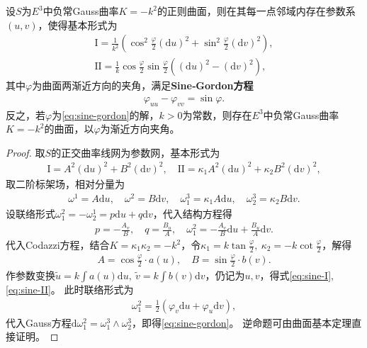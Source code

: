 \documentclass[../../main.tex]{subfiles}%
\begin{document}
\begin{proposition}
设$S$为$E^3$中负常Gauss曲率$K=-k^2$的正则曲面，则在其每一点邻域内存在参数系$(u,v)$，使得基本形式为
\begin{align}
\mathrm{I}=\frac{1}{k^2}\left(\cos^2\frac{\varphi}{2}(\mathrm{d}u)^2+\sin^2\frac{\varphi}{2}(\mathrm{d}v)^2\right),\label{eq:sine-I}\\
\mathrm{II}=\frac{1}{k}\cos\frac{\varphi}{2}\sin\frac{\varphi}{2}\left((\mathrm{d}u)^2-(\mathrm{d}v)^2\right),\label{eq:sine-II}
\end{align}
其中$\varphi$为曲面两渐近方向的夹角，满足\textbf{Sine‑Gordon方程}
\begin{align}
\varphi_{uu}-\varphi_{vv}=\sin\varphi.\label{eq:sine-gordon}
\end{align}
反之，若$\varphi$为\eqref{eq:sine-gordon}的解，$k>0$为常数，则存在$E^3$中负常Gauss曲率$K=-k^2$的曲面，以$\varphi$为渐近方向夹角。
\end{proposition}
\begin{proof}
取$S$的正交曲率线网为参数网，基本形式为
\begin{align*}
\mathrm{I}=A^2(\mathrm{d}u)^2+B^2(\mathrm{d}v)^2,\quad \mathrm{II}=\kappa_1A^2(\mathrm{d}u)^2+\kappa_2B^2(\mathrm{d}v)^2,
\end{align*}
取二阶标架场，相对分量为
\begin{align*}
\omega^1=A\mathrm{d}u,\quad \omega^2=B\mathrm{d}v,\quad \omega_1^3=\kappa_1A\mathrm{d}u,\quad \omega_2^3=\kappa_2B\mathrm{d}v.
\end{align*}
设联络形式$\omega_1^2=-\omega_2^1=p\mathrm{d}u+q\mathrm{d}v$，代入结构方程得
\begin{align*}
p=-\frac{A_v}{B},\quad q=\frac{B_u}{A},\quad \omega_1^2=-\frac{A_v}{B}\mathrm{d}u+\frac{B_u}{A}\mathrm{d}v.
\end{align*}
代入Codazzi方程，结合$K=\kappa_1\kappa_2=-k^2$，令$\kappa_1=k\tan\frac{\varphi}{2},\ \kappa_2=-k\cot\frac{\varphi}{2}$，解得
\begin{align*}
A=\cos\frac{\varphi}{2}\cdot a(u),\quad B=\sin\frac{\varphi}{2}\cdot b(v).
\end{align*}
作参数变换$\tilde{u}=k\int a(u)\mathrm{d}u,\ \tilde{v}=k\int b(v)\mathrm{d}v$，仍记为$u,v$，得式\eqref{eq:sine-I},\eqref{eq:sine-II}。
此时联络形式为
\begin{align*}
\omega_1^2=\frac{1}{2}(\varphi_v\mathrm{d}u+\varphi_u\mathrm{d}v),
\end{align*}
代入Gauss方程$\mathrm{d}\omega_1^2=\omega_1^3\wedge\omega_2^3$，即得\eqref{eq:sine-gordon}。
逆命题可由曲面基本定理直接证明。
\end{proof}
\end{document}
